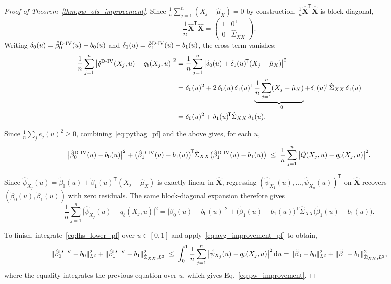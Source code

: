 \documentclass[12pt]{article}
\newcommand{\T}{\mathsf{T}} %
\newcommand{\est}{\ensuremath{\textnormal{D-IV}}\xspace}
\newcommand{\dd}{\mathrm{d}} %
\begin{document}
\begin{proof}[Proof of Theorem~\ref{thm:pw_ols_improvement}]
Since $\frac{1}{n}\sum_{j=1}^n (X_j - \hat{\mu}_X) = 0$ by construction,  $\frac{1}{n}\hat{\mathbf{X}}^{\!\T}\hat{\mathbf{X}}$ is block-diagonal,
\[
\frac{1}{n}\hat{\mathbf{X}}^{\!\T}\hat{\mathbf{X}} = \begin{pmatrix} 1 & 0^{\!\T} \\ 0 & \hat{\Sigma}_{XX} \end{pmatrix}.
\]
Writing $\delta_0(u) = \hat{\beta}_0^{\est}(u) - b_0(u)$ and $\delta_1(u) = \hat{\beta}_1^{\est}(u) - b_1(u)$, the cross term vanishes:
\begin{align*}
\frac{1}{n}\sum_{j=1}^n \big|\hat{q}^{\est}(X_j, u) - q_b(X_j, u)\big|^2
&= \frac{1}{n}\sum_{j=1}^n \big|\delta_0(u) + \delta_1(u)^{\!\T}(X_j - \hat{\mu}_X)\big|^2 \\
&= \delta_0(u)^2 + 2\,\delta_0(u)\,\delta_1(u)^{\!\T}\underbrace{\frac{1}{n}\sum_{j=1}^n(X_j - \hat{\mu}_X)}_{=\,0} + \delta_1(u)^{\!\T}\hat{\Sigma}_{XX}\,\delta_1(u) \\
&= \delta_0(u)^2 + \delta_1(u)^{\!\T}\hat{\Sigma}_{XX}\,\delta_1(u).
\end{align*}

Since $\frac{1}{n}\sum_j e_j(u)^2 \geq 0$, combining~\eqref{eq:pythag_pf} and the above gives, for each $u$,
\begin{equation}\label{eq:lhs_lower_pf}
\big|\hat{\beta}_0^{\est}(u) - b_0(u)\big|^2 + \big(\hat{\beta}_1^{\est}(u) - b_1(u)\big)^{\!\T}\hat{\Sigma}_{XX}\big(\hat{\beta}_1^{\est}(u) - b_1(u)\big) \;\leq\; \frac{1}{n}\sum_{j=1}^n \big|\hat{Q}(X_j, u) - q_b(X_j, u)\big|^2.
\end{equation}

Since $\hat{\psi}_{X_j}(u) = \tilde{\beta}_0(u) + \tilde{\beta}_1(u)^{\!\T}(X_j - \hat{\mu}_X)$ is exactly linear in $\hat{\mathbf{X}}$, regressing $(\hat{\psi}_{X_1}(u), \ldots, \hat{\psi}_{X_n}(u))^{\!\T}$ on $\hat{\mathbf{X}}$ recovers $(\tilde{\beta}_0(u), \tilde{\beta}_1(u))$ with zero residuals. The same block-diagonal expansion therefore gives
\[
\frac{1}{n}\sum_{j=1}^n \big|\hat{\psi}_{X_j}(u) - q_b(X_j, u)\big|^2 = \big|\tilde{\beta}_0(u) - b_0(u)\big|^2 + \big(\tilde{\beta}_1(u) - b_1(u)\big)^{\!\T}\hat{\Sigma}_{XX}\big(\tilde{\beta}_1(u) - b_1(u)\big).
\]


To finish, integrate~\eqref{eq:lhs_lower_pf} over $u \in [0,1]$ and apply~\eqref{eq:avg_improvement_pf} to obtain,
\[
\|\hat{\beta}_0^{\est} - b_0\|_{L^2}^2 + \|\hat{\beta}_1^{\est} - b_1\|_{\hat{\Sigma}_{XX}, L^2}^2 \;\leq\; \int_0^1 \frac{1}{n}\sum_{j=1}^n \big|\hat{\psi}_{X_j}(u) - q_b(X_j, u)\big|^2\, \dd u = \|\tilde{\beta}_0 - b_0\|_{L^2}^2 + \|\tilde{\beta}_1 - b_1\|_{\hat{\Sigma}_{XX}, L^2}^2,
\]
where the equality integrates the previous equation over $u$, which gives Eq.~\eqref{eq:pw_improvement}.
\end{proof}
\end{document}
